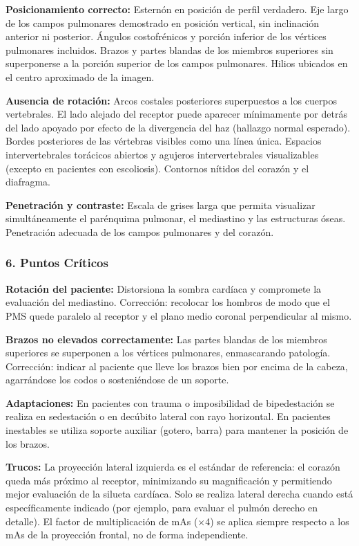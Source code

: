 	\textbf{Posicionamiento correcto:} Esternón en posición de perfil verdadero. Eje largo de los campos pulmonares demostrado en posición vertical, sin inclinación anterior ni posterior. Ángulos costofrénicos y porción inferior de los vértices pulmonares incluidos. Brazos y partes blandas de los miembros superiores sin superponerse a la porción superior de los campos pulmonares. Hilios ubicados en el centro aproximado de la imagen.
	
	\textbf{Ausencia de rotación:} Arcos costales posteriores superpuestos a los cuerpos vertebrales. El lado alejado del receptor puede aparecer mínimamente por detrás del lado apoyado por efecto de la divergencia del haz (hallazgo normal esperado). Bordes posteriores de las vértebras visibles como una línea única. Espacios intervertebrales torácicos abiertos y agujeros intervertebrales visualizables (excepto en pacientes con escoliosis). Contornos nítidos del corazón y el diafragma.
	
	\textbf{Penetración y contraste:} Escala de grises larga que permita visualizar simultáneamente el parénquima pulmonar, el mediastino y las estructuras óseas. Penetración adecuada de los campos pulmonares y del corazón.
	
	\subsubsection*{6. Puntos Críticos}
	
	\textbf{Rotación del paciente:} Distorsiona la sombra cardíaca y compromete la evaluación del mediastino. Corrección: recolocar los hombros de modo que el PMS quede paralelo al receptor y el plano medio coronal perpendicular al mismo.
	
	\textbf{Brazos no elevados correctamente:} Las partes blandas de los miembros superiores se superponen a los vértices pulmonares, enmascarando patología. Corrección: indicar al paciente que lleve los brazos bien por encima de la cabeza, agarrándose los codos o sosteniéndose de un soporte.
	
	\textbf{Adaptaciones:} En pacientes con trauma o imposibilidad de bipedestación se realiza en sedestación o en decúbito lateral con rayo horizontal. En pacientes inestables se utiliza soporte auxiliar (gotero, barra) para mantener la posición de los brazos.
	
	\textbf{Trucos:} La proyección lateral izquierda es el estándar de referencia: el corazón queda más próximo al receptor, minimizando su magnificación y permitiendo mejor evaluación de la silueta cardíaca. Solo se realiza lateral derecha cuando está específicamente indicado (por ejemplo, para evaluar el pulmón derecho en detalle). El factor de multiplicación de mAs (×4) se aplica siempre respecto a los mAs de la proyección frontal, no de forma independiente.
	
